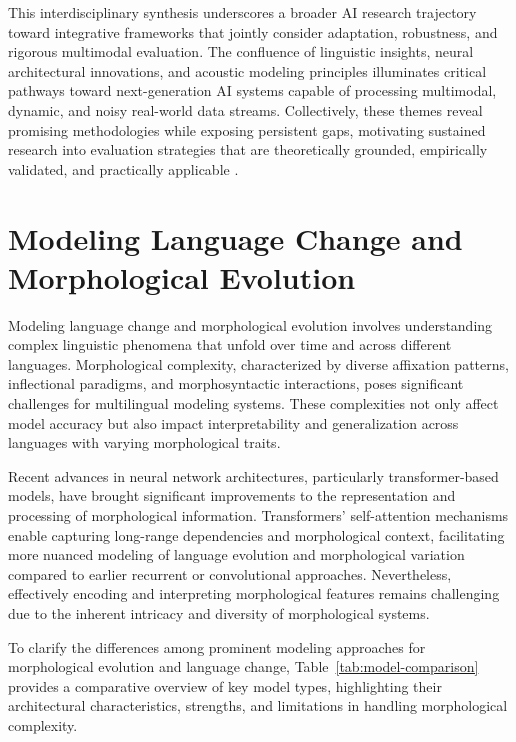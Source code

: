 \documentclass[sigconf]{acmart}
\begin{document}
This interdisciplinary synthesis underscores a broader AI research trajectory toward integrative frameworks that jointly consider adaptation, robustness, and rigorous multimodal evaluation. The confluence of linguistic insights, neural architectural innovations, and acoustic modeling principles illuminates critical pathways toward next-generation AI systems capable of processing multimodal, dynamic, and noisy real-world data streams. Collectively, these themes reveal promising methodologies while exposing persistent gaps, motivating sustained research into evaluation strategies that are theoretically grounded, empirically validated, and practically applicable \cite{ref1,ref26}.

\section{Modeling Language Change and Morphological Evolution}

Modeling language change and morphological evolution involves understanding complex linguistic phenomena that unfold over time and across different languages. Morphological complexity, characterized by diverse affixation patterns, inflectional paradigms, and morphosyntactic interactions, poses significant challenges for multilingual modeling systems. These complexities not only affect model accuracy but also impact interpretability and generalization across languages with varying morphological traits.

Recent advances in neural network architectures, particularly transformer-based models, have brought significant improvements to the representation and processing of morphological information. Transformers' self-attention mechanisms enable capturing long-range dependencies and morphological context, facilitating more nuanced modeling of language evolution and morphological variation compared to earlier recurrent or convolutional approaches. Nevertheless, effectively encoding and interpreting morphological features remains challenging due to the inherent intricacy and diversity of morphological systems.

To clarify the differences among prominent modeling approaches for morphological evolution and language change, Table~\ref{tab:model-comparison} provides a comparative overview of key model types, highlighting their architectural characteristics, strengths, and limitations in handling morphological complexity.
\end{document}
